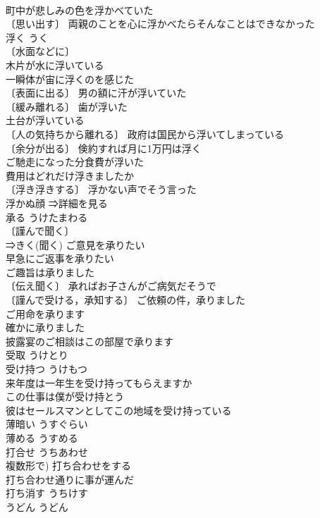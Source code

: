 \documentclass[8pt]{extreport}
\begin{document}
\begin{CJK}{UTF8}{min}
\\	町中が悲しみの色を浮かべていた 
\\	〔思い出す〕 両親のことを心に浮かべたらそんなことはできなかった 
\\	浮く	うく	
\\	〔水面などに〕
\\	木片が水に浮いている 
\\	一瞬体が宙に浮くのを感じた 
\\	〔表面に出る〕 男の額に汗が浮いていた 
\\	〔緩み離れる〕 歯が浮いた 
\\	土台が浮いている 
\\	〔人の気持ちから離れる〕 政府は国民から浮いてしまっている 
\\	〔余分が出る〕 倹約すれば月に1万円は浮く 
\\	ご馳走になった分食費が浮いた 
\\	費用はどれだけ浮きましたか 
\\	〔浮き浮きする〕 浮かない声でそう言った 
\\	浮かぬ顔 ⇒詳細を見る
\\	承る	うけたまわる	
\\	〔謹んで聞く〕
\\	⇒きく(聞く) ご意見を承りたい 
\\	早急にご返事を承りたい 
\\	ご趣旨は承りました 
\\	〔伝え聞く〕 承ればお子さんがご病気だそうで 
\\	〔謹んで受ける，承知する〕 ご依頼の件，承りました 
\\	ご用命を承ります 
\\	確かに承りました 
\\	披露宴のご相談はこの部屋で承ります 
\\	受取	うけとり	
\\	受け持つ	うけもつ	
\\	来年度は一年生を受け持ってもらえますか 
\\	この仕事は僕が受け持とう 
\\	彼はセールスマンとしてこの地域を受け持っている 
\\	薄暗い	うすぐらい	
\\	薄める	うすめる	
\\	打合せ	うちあわせ	
\\	複数形で) 打ち合わせをする 
\\	打ち合わせ通りに事が運んだ 
\\	打ち消す	うちけす	
\\	うどん	うどん	

\end{CJK}
\end{document}

